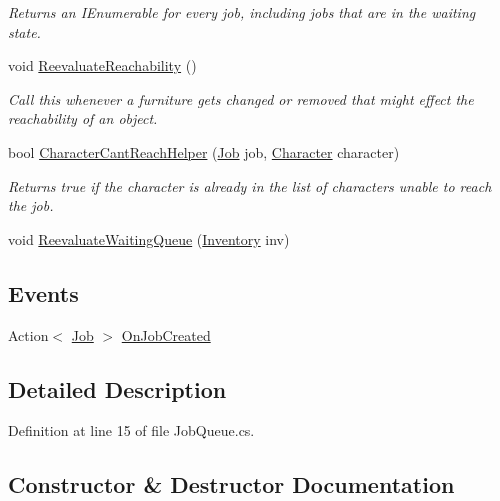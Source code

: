 \begin{DoxyCompactItemize}
\begin{DoxyCompactList}\small\item\em Returns an I\+Enumerable for every job, including jobs that are in the waiting state. \end{DoxyCompactList}\item 
void \hyperlink{class_job_queue_ab1c1837e1ad90e8b694cdb9df334bbc3}{Reevaluate\+Reachability} ()
\begin{DoxyCompactList}\small\item\em Call this whenever a furniture gets changed or removed that might effect the reachability of an object. \end{DoxyCompactList}\item 
bool \hyperlink{class_job_queue_a81f045f724b0f40fa79fe59f8784fe69}{Character\+Cant\+Reach\+Helper} (\hyperlink{class_job}{Job} job, \hyperlink{class_project_porcupine_1_1_entities_1_1_character}{Character} character)
\begin{DoxyCompactList}\small\item\em Returns true if the character is already in the list of characters unable to reach the job. \end{DoxyCompactList}\item 
void \hyperlink{class_job_queue_abc8f1aa2834e93b59016906b35a5281d}{Reevaluate\+Waiting\+Queue} (\hyperlink{class_inventory}{Inventory} inv)
\end{DoxyCompactItemize}
\subsection*{Events}
\begin{DoxyCompactItemize}
\item 
Action$<$ \hyperlink{class_job}{Job} $>$ \hyperlink{class_job_queue_a9b7c35beb78b53bd8ae67b699e0758d9}{On\+Job\+Created}
\end{DoxyCompactItemize}


\subsection{Detailed Description}


Definition at line 15 of file Job\+Queue.\+cs.



\subsection{Constructor \& Destructor Documentation}
\mbox{\label{class_job_queue_a289d49dff9c2c49656dd589bd64c3aa6}} 
